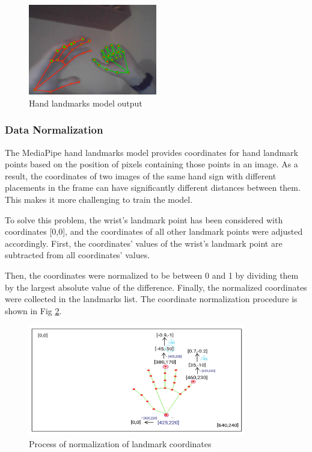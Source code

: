 \begin{figure}
	\centering
	\includegraphics[width = 0.5\textwidth]{images/landmarks_both_hands.png}
	\caption{Hand landmarks model output}
	\label{fig:landmark_both_hands}
\end{figure}

\subsubsection*{Data Normalization}
The MediaPipe hand landmarks model provides coordinates for hand landmark points based on the position of pixels containing those points in an image. As a result, the coordinates of two images of the same hand sign with different placements in the frame can have significantly different distances between them. This makes it more challenging to train the model.

To solve this problem, the wrist's landmark point has been considered with coordinates [0,0], and the coordinates of all other landmark points were adjusted accordingly.
First, the coordinates' values of the wrist's landmark point are subtracted from all coordinates' values. 

Then, the coordinates were normalized to be between 0 and 1 by dividing them by the largest absolute value of the difference. Finally, the normalized coordinates were collected in the landmarks list. The coordinate normalization procedure is shown in Fig \ref{fig:normalization}.


\begin{figure}
	\centering
	\includegraphics[width = 0.85\textwidth]{images/normalise.pdf}
	\caption{Process of normalization of landmark coordinates}
	\label{fig:normalization}
\end{figure}

